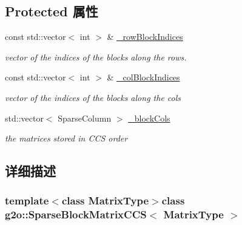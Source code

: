 \subsection*{Protected 属性}
\begin{DoxyCompactItemize}
\item 
\hypertarget{classg2o_1_1SparseBlockMatrixCCS_afabda9a2efe5ea9efb5a1e5312f6e307}{const std\-::vector$<$ int $>$ \& \hyperlink{classg2o_1_1SparseBlockMatrixCCS_afabda9a2efe5ea9efb5a1e5312f6e307}{\-\_\-row\-Block\-Indices}}\label{classg2o_1_1SparseBlockMatrixCCS_afabda9a2efe5ea9efb5a1e5312f6e307}

\begin{DoxyCompactList}\small\item\em vector of the indices of the blocks along the rows. \end{DoxyCompactList}\item 
\hypertarget{classg2o_1_1SparseBlockMatrixCCS_ae31426bfb6b31bd0fd72de2e18dd5a35}{const std\-::vector$<$ int $>$ \& \hyperlink{classg2o_1_1SparseBlockMatrixCCS_ae31426bfb6b31bd0fd72de2e18dd5a35}{\-\_\-col\-Block\-Indices}}\label{classg2o_1_1SparseBlockMatrixCCS_ae31426bfb6b31bd0fd72de2e18dd5a35}

\begin{DoxyCompactList}\small\item\em vector of the indices of the blocks along the cols \end{DoxyCompactList}\item 
\hypertarget{classg2o_1_1SparseBlockMatrixCCS_ab6b173607380a367cc1cd67442c1c3e2}{std\-::vector$<$ Sparse\-Column $>$ \hyperlink{classg2o_1_1SparseBlockMatrixCCS_ab6b173607380a367cc1cd67442c1c3e2}{\-\_\-block\-Cols}}\label{classg2o_1_1SparseBlockMatrixCCS_ab6b173607380a367cc1cd67442c1c3e2}

\begin{DoxyCompactList}\small\item\em the matrices stored in C\-C\-S order \end{DoxyCompactList}\end{DoxyCompactItemize}


\subsection{详细描述}
\subsubsection*{template$<$class Matrix\-Type$>$class g2o\-::\-Sparse\-Block\-Matrix\-C\-C\-S$<$ Matrix\-Type $>$}

